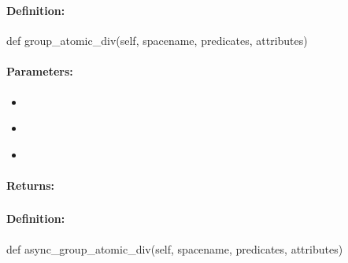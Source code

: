 \pagebreak
\subsubsection{}
\label{api:python:group_atomic_div}


\paragraph{Definition:}
\begin{pythoncode}
def group_atomic_div(self, spacename, predicates, attributes)
\end{pythoncode}

\paragraph{Parameters:}
\begin{itemize}[noitemsep]
\item {}\\

\item {}\\

\item {}\\

\end{itemize}

\paragraph{Returns:}


\pagebreak
\subsubsection{}
\label{api:python:async_group_atomic_div}


\paragraph{Definition:}
\begin{pythoncode}
def async_group_atomic_div(self, spacename, predicates, attributes)
\end{pythoncode}

